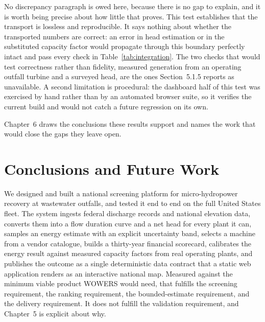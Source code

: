 \documentclass[12pt,letterpaper]{report}
\begin{document}
No discrepancy paragraph is owed here, because there is no gap to explain, and it
is worth being precise about how little that proves. This test establishes that the
transport is lossless and reproducible. It says nothing about whether the transported
numbers are correct: an error in head estimation or in the substituted capacity factor
would propagate through this boundary perfectly intact and pass every check in
Table~\ref{tab:integration}. The two checks that would test correctness rather than
fidelity, measured generation from an operating outfall turbine and a surveyed head,
are the ones Section~5.1.5 reports as unavailable. A second limitation is procedural:
the dashboard half of this test was exercised by hand rather than by an automated
browser suite, so it verifies the current build and would not catch a future
regression on its own.

Chapter~6 draws the conclusions these results support and names the work that would
close the gaps they leave open.

\chapter{Conclusions and Future Work}

We designed and built a national screening platform for micro-hydropower recovery
at wastewater outfalls, and tested it end to end on the full United States fleet.
The system ingests federal discharge records and national elevation data, converts
them into a flow duration curve and a net head for every plant it can, samples an
energy estimate with an explicit uncertainty band, selects a machine from a vendor
catalogue, builds a thirty-year financial scorecard, calibrates the energy result
against measured capacity factors from real operating plants, and publishes the
outcome as a single deterministic data contract that a static web application
renders as an interactive national map. Measured against the minimum viable
product WOWERS would need, that fulfills the screening requirement, the ranking
requirement, the bounded-estimate requirement, and the delivery requirement. It
does not fulfill the validation requirement, and Chapter~5 is explicit about why.
\end{document}
